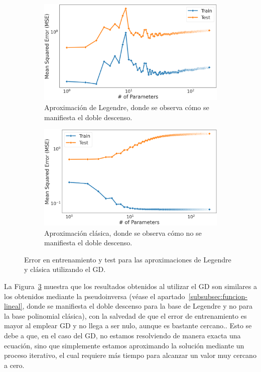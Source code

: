 \begin{figure}[h]
    \centering
    \begin{subfigure}[b]{0.48\textwidth}
        \centering
        \includegraphics[width=\textwidth]{img/experiments/LegendreFeaturesGD_DDD.png}
        \caption{Aproximación de Legendre, donde se observa cómo se manifiesta el doble descenso.}\label{fig:LegendreFeaturesGD_DDD}
    \end{subfigure}
    \hfill
    \begin{subfigure}[b]{0.48\textwidth}
        \centering
        \includegraphics[width=\textwidth]{img/experiments/PolyFeaturesGD_DDD.png}
        \caption{Aproximación clásica, donde se observa cómo no se manifiesta el doble descenso.}\label{fig:PolyFeaturesGD_DDD}
    \end{subfigure}
    \caption[Error en entrenamiento y test para las aproximaciones de Legendre y clásica utilizando el GD.]{Error en entrenamiento y test para las aproximaciones de Legendre y clásica utilizando el GD.}\label{fig:aproximaciones-gd}
\end{figure}

La Figura~\ref{fig:aproximaciones-gd} muestra que los resultados obtenidos al utilizar el GD son similares a los obtenidos mediante la pseudoinversa (véase el apartado~\ref{subsubsec:funcion-lineal}, donde se manifiesta el doble descenso para la base de Legendre y no para la base polinomial clásica), con la salvedad de que el error de entrenamiento es mayor al emplear GD y no llega a ser nulo, aunque es bastante cercano.. Esto se debe a que, en el caso del GD, no estamos resolviendo de manera exacta una ecuación, sino que simplemente estamos aproximando la solución mediante un proceso iterativo, el cual requiere más tiempo para alcanzar un valor muy cercano a cero.\newline


